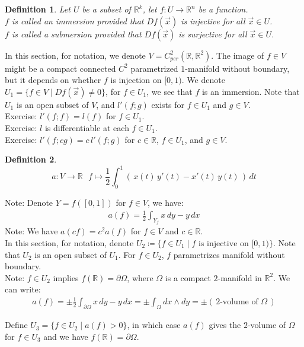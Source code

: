 \documentclass[15pt]{book}
\theoremstyle{break}
\theoremstyle{break}
\newtheorem{defn}{Definition}[corL]
\newcommand{\R}{\mathbb{R}}
\newcommand{\note}{\color{red}Note: \color{black}}
\newcommand{\exercise}{\color{green}Exercise: \color{black}}
\begin{document}
\begin{defn}
Let $U$ be a subset of $\R^k$, let $f:U \to \R^n$ be a function.\\ 
$f$ is called an immersion provided that $Df(\vec{x})$ is injective for all $\vec{x}\in U$. \\
$f$ is called a submersion provided that $Df(\vec{x})$ is surjective for all $\vec{x}\in U$.  
\end{defn}

In this section, for notation, we denote $V = C_{per}^2 (\R,\R^2)$. The image of $f \in V$ might be a compact connected $C^2$ parametrized $1$-manifold without boundary, but it depends on whether $f$ is injection on $[0,1)$. We denote $U_1 = \{ f\in V \mid Df(\vec{x}) \neq 0\}$, for $f \in U_1$, we see that $f$ is an immersion. Note that $U_1$ is an open subset of $V$, and $l'(f;g)$ exists for $f \in U_1$ and $g \in V$.\\

\exercise $l'(f;f) = l(f)$ for $f \in U_1$. \\
\exercise $l$ is differentiable at each $f \in U_1$. \\
\exercise $l'(f; cg) = c\, l'(f;g)$ for $c \in \R$, $f \in U_1$, and $g \in V$.\\

\begin{defn}
$$a:V \to \R \ \ \ f\mapsto \frac{1}{2}\int_0^1 (\,x(t)\,y'(t) - x'(t)\,y(t)\,)\, dt$$
\end{defn}
\note Denote $Y = f([0,1])$ for $f \in V$, we have:
\begin{align*}
a(f) = \frac{1}{2}\int_{Y_f} x\, dy - y\, dx 
\end{align*}
\note We have $a(cf) = c^2a(f)$ for $f \in V$ and $c \in \R$.\\

In this section, for notation, denote $U_2 \coloneqq \{ f \in U_1 \mid f\text{ is injective on }[0,1)\}$. Note that $U_2$ is an open subset of $U_1$. For $f\in U_2$, $f$ parametrizes manifold without boundary.\\

\note $f \in U_2$ implies $f(\R)  = \partial \Omega$, where $\Omega$ is a compact $2$-manifold in $\R^2$. We can write:
\begin{align*}
a(f) =\pm  \frac{1}{2}\int_{\partial \Omega} x\, dy - y\, dx = \pm \int_{\Omega} dx \wedge dy =\pm (\,2\text{-volume of }\Omega\,)
\end{align*} 

Define $U_3 = \{ f\in U_2 \mid a(f) >0 \}$, in which case $a(f)$ gives the $2$-volume of $\Omega$ for $f \in U_3$ and we have $f(\R) = \partial \Omega$. \\
\end{document}

